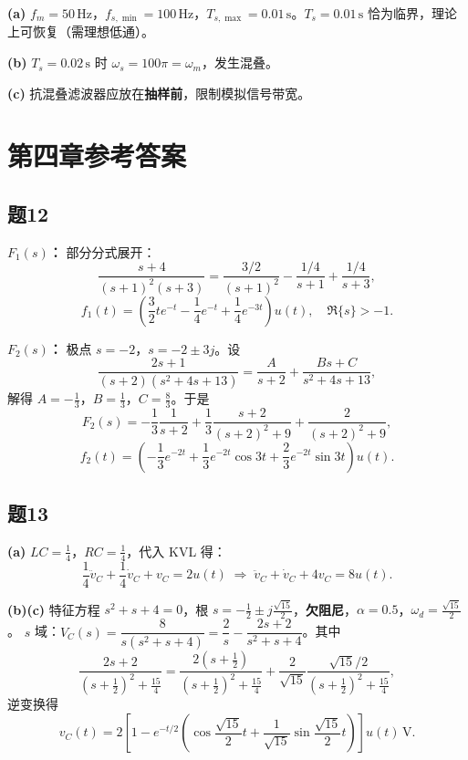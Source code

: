 \documentclass[11pt,a4paper]{ctexart}
\begin{document}
\textbf{(a)} $f_m=50\,\mathrm{Hz}$，$f_{s,\min}=100\,\mathrm{Hz}$，$T_{s,\max}=0.01\,\mathrm{s}$。$T_s=0.01\,\mathrm{s}$ 恰为临界，理论上可恢复（需理想低通）。

\textbf{(b)} $T_s=0.02\,\mathrm{s}$ 时 $\omega_s=100\pi=\omega_m$，发生混叠。

\textbf{(c)} 抗混叠滤波器应放在\textbf{抽样前}，限制模拟信号带宽。

\section{第四章参考答案}

\subsection*{题12}

\textbf{$F_1(s)$：} 部分分式展开：
\[
\frac{s+4}{(s+1)^2(s+3)}=\frac{3/2}{(s+1)^2}-\frac{1/4}{s+1}+\frac{1/4}{s+3},
\]
\[
f_1(t)=\left(\frac{3}{2}t e^{-t}-\frac{1}{4}e^{-t}+\frac{1}{4}e^{-3t}\right)u(t),\quad \Re\{s\}>-1.
\]

\textbf{$F_2(s)$：} 极点 $s=-2$，$s=-2\pm 3j$。设
\[
\frac{2s+1}{(s+2)(s^2+4s+13)}=\frac{A}{s+2}+\frac{Bs+C}{s^2+4s+13},
\]
解得 $A=-\frac{1}{3}$，$B=\frac{1}{3}$，$C=\frac{8}{3}$。于是
\[
F_2(s)=-\frac{1}{3}\frac{1}{s+2}+\frac{1}{3}\frac{s+2}{(s+2)^2+9}+\frac{2}{(s+2)^2+9},
\]
\[
f_2(t)=\left(-\frac{1}{3}e^{-2t}+\frac{1}{3}e^{-2t}\cos 3t+\frac{2}{3}e^{-2t}\sin 3t\right)u(t).
\]

\subsection*{题13}

\textbf{(a)} $LC=\frac{1}{4}$，$RC=\frac{1}{4}$，代入 KVL 得：
\[
\frac{1}{4}\ddot{v}_C+\frac{1}{4}\dot{v}_C+v_C=2u(t)
\;\Longrightarrow\;
\ddot{v}_C+\dot{v}_C+4v_C=8u(t).
\]

\textbf{(b)(c)} 特征方程 $s^2+s+4=0$，根 $s=-\frac{1}{2}\pm j\frac{\sqrt{15}}{2}$，\textbf{欠阻尼}，$\alpha=0.5$，$\omega_d=\frac{\sqrt{15}}{2}$。
$s$ 域：$V_C(s)=\dfrac{8}{s(s^2+s+4)}=\dfrac{2}{s}-\dfrac{2s+2}{s^2+s+4}$。其中
\[
\frac{2s+2}{(s+\frac{1}{2})^2+\frac{15}{4}}
=\frac{2(s+\frac{1}{2})}{(s+\frac{1}{2})^2+\frac{15}{4}}+\frac{2}{\sqrt{15}}\frac{\sqrt{15}/2}{(s+\frac{1}{2})^2+\frac{15}{4}},
\]
逆变换得
\[
v_C(t)=2\left[1-e^{-t/2}\!\left(\cos\frac{\sqrt{15}}{2}t+\frac{1}{\sqrt{15}}\sin\frac{\sqrt{15}}{2}t\right)\right]u(t)\,\mathrm{V}.
\]
\end{document}
